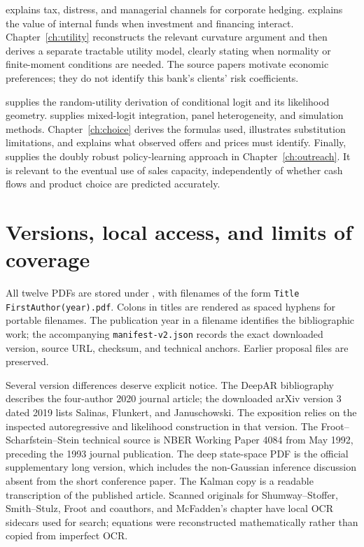 \citet{smith1985} explains tax, distress, and managerial channels for corporate hedging. \citet{froot1993} explains the value of internal funds when investment and financing interact. Chapter~\ref{ch:utility} reconstructs the relevant curvature argument and then derives a separate tractable utility model, clearly stating when normality or finite-moment conditions are needed. The source papers motivate economic preferences; they do not identify this bank's clients' risk coefficients.

\citet{mcfadden1974} supplies the random-utility derivation of conditional logit and its likelihood geometry. \citet{mcfadden2000} supplies mixed-logit integration, panel heterogeneity, and simulation methods. Chapter~\ref{ch:choice} derives the formulas used, illustrates substitution limitations, and explains what observed offers and prices must identify. Finally, \citet{wager2021policy} supplies the doubly robust policy-learning approach in Chapter~\ref{ch:outreach}. It is relevant to the eventual use of sales capacity, independently of whether cash flows and product choice are predicted accurately.

\section{Versions, local access, and limits of coverage}
All twelve PDFs are stored under , with filenames of the form \texttt{Title FirstAuthor(year).pdf}. Colons in titles are rendered as spaced hyphens for portable filenames. The publication year in a filename identifies the bibliographic work; the accompanying \texttt{manifest-v2.json} records the exact downloaded version, source URL, checksum, and technical anchors. Earlier proposal files are preserved.

Several version differences deserve explicit notice. The DeepAR bibliography describes the four-author 2020 journal article; the downloaded arXiv version 3 dated 2019 lists Salinas, Flunkert, and Januschowski. The exposition relies on the inspected autoregressive and likelihood construction in that version. The Froot--Scharfstein--Stein technical source is NBER Working Paper 4084 from May 1992, preceding the 1993 journal publication. The deep state-space PDF is the official supplementary long version, which includes the non-Gaussian inference discussion absent from the short conference paper. The Kalman copy is a readable transcription of the published article. Scanned originals for Shumway--Stoffer, Smith--Stulz, Froot and coauthors, and McFadden's chapter have local OCR sidecars used for search; equations were reconstructed mathematically rather than copied from imperfect OCR.

